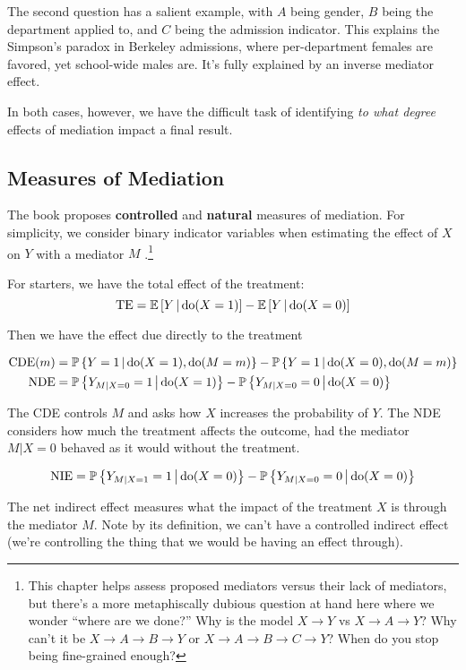 \documentclass{article}
\begin{document}
The second question has a salient example, with $A$ being gender, $B$ being the department applied to, and $C$ being the admission indicator. This explains the Simpson's paradox in Berkeley admissions, where per-department females are favored, yet school-wide males are. It's fully explained by an inverse mediator effect.

In both cases, however, we have the difficult task of identifying \textit{to what degree} effects of mediation impact a final result.

\subsection{Measures of Mediation}

The book proposes \textbf{controlled} and \textbf{natural} measures of mediation. For simplicity, we consider binary indicator variables when estimating the effect of $X$ on $Y$ with a mediator $M$ \cite{pearl2014interpretation}.\footnote{This chapter helps assess proposed mediators versus their lack of mediators, but there's a more metaphiscally dubious question at hand here where we wonder ``where are we done?'' Why is the model $X\rightarrow Y$ vs $X\rightarrow A \rightarrow Y$? Why can't it be $X\rightarrow A \rightarrow B\rightarrow Y$ or $X\rightarrow A \rightarrow B\rightarrow C\rightarrow Y$? When do you stop being fine-grained enough?}

For starters, we have the total effect of the treatment:
$$
\mathrm{TE}=\operatorname{\mathbb{E}}\left[ Y \,\middle|\, \mathrm{do}(X=1) \right]-\operatorname{\mathbb{E}}\left[ Y \,\middle|\, \mathrm{do}(X=0) \right]
$$

Then we have the effect due directly to the treatment

\begin{align*}
  \mathrm{CDE}(m)&=\operatorname{\mathbb{P}}\left\{ Y=1 \,\middle|\, \mathrm{do}(X=1), \mathrm{do}(M=m) \right\} -\operatorname{\mathbb{P}}\left\{ Y=1 \,\middle|\, \mathrm{do}(X=0), \mathrm{do}(M=m) \right\}\\
  \mathrm{NDE}&=\operatorname{\mathbb{P}}\left\{ Y_{M|X=0}=1 \,\middle|\, \mathrm{do}(X=1) \right\} -\operatorname{\mathbb{P}}\left\{ Y_{M|X=0}=0 \,\middle|\, \mathrm{do}(X=0) \right\}
\end{align*}

The CDE controls $M$ and asks how $X$ increases the probability of $Y$. The NDE considers how much the treatment affects the outcome, had the mediator $M|X=0$ behaved as it would without the treatment.

$$
  \mathrm{NIE}=\operatorname{\mathbb{P}}\left\{ Y_{M|X=1}=1 \,\middle|\, \mathrm{do}(X=0) \right\} -\operatorname{\mathbb{P}}\left\{ Y_{M|X=0}=0 \,\middle|\, \mathrm{do}(X=0) \right\}
$$

The net indirect effect measures what the impact of the treatment $X$ is through the mediator $M$. Note by its definition, we can't have a controlled indirect effect (we're controlling the thing that we would be having an effect through).
\end{document}
